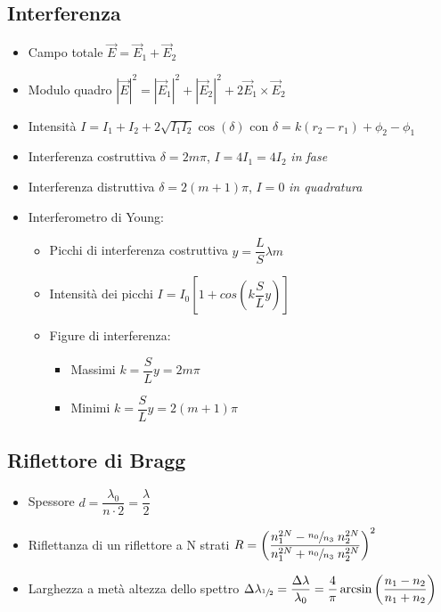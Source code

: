 \documentclass{article}
\begin{document}
\subsection{Interferenza}
\begin{itemize}
  \item Campo totale \( \vec{E} = \vec{E}_1 + \vec{E}_2 \)
  \item Modulo quadro \( \displaystyle |\vec{E}| ^ 2 = |\vec{E}_1| ^ 2 + |\vec{E}_2| ^ 2 + 2 \vec{E}_1 \times \vec{E}_2 \)
  \item Intensità \( \displaystyle  I = I_1 + I_2 + 2 \sqrt{I_1 I_2} \cos(\delta) \) con \( \delta = k(r_2 - r_1) + \phi_2 - \phi_1 \) %
  \item Interferenza costruttiva \( \delta = 2 m \pi \), \(I = 4 I_1 = 4 I_2 \) \textit{in fase}
  \item Interferenza distruttiva \( \delta = 2 (m + 1) \pi \), \(I = 0 \) \textit{in quadratura}
  \item Interferometro di Young:
        \begin{itemize}
          \item Picchi di interferenza costruttiva \( y = \dfrac{L}{S} \lambda m \)
          \item Intensità dei picchi \( I = I_0  \left[ 1 + cos\left( k \dfrac{S}{L} y \right) \right] \)
          \item Figure di interferenza:
                \begin{itemize}
                  \item Massimi \( k = \dfrac{S}{L} y = 2m \pi \)
                  \item Minimi \( k = \dfrac{S}{L} y = 2(m+1) \pi \)
                \end{itemize}
        \end{itemize}
\end{itemize}

\newpage

\subsection{Riflettore di Bragg}
\begin{itemize}
  \item Spessore \( d = \dfrac{\lambda_0}{n \cdot 2} = \dfrac{\lambda}{2} \)
  \item Riflettanza di un riflettore a N strati \( R = \left( \dfrac{n_1 ^ {2N} - \sfrac{n_0}{n_3} \; n_2 ^ {2N}}{n_1 ^ {2N} + \sfrac{n_0}{n_3} \; n_2 ^ {2N}} \right) ^ 2 \)
  \item Larghezza a metà altezza dello spettro \( \Delta \lambda_{\sfrac{1}{2}} = \dfrac{\Delta \lambda}{\lambda_0} = \dfrac{4}{\pi} \arcsin \left( \dfrac{n_1 - n_2}{n_1 + n_2} \right) \)
\end{itemize}
\end{document}
